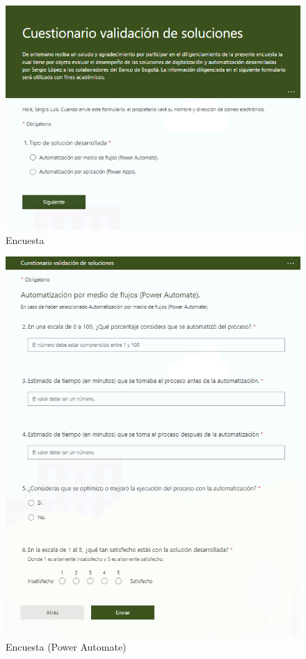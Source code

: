 \begin{figure}[H]
	\centering
	\includegraphics[scale=0.4]{Capitulo5/imagenes/1.1}
	\caption{Encuesta}
	\label{fig:fomrs}
\end{figure}
\begin{figure}[H]
	\centering
	\includegraphics[scale=0.4]{Capitulo5/imagenes/a2.1}
	\caption{Encuesta (Power Automate)}
	\label{fig:fomrs2}
\end{figure}

